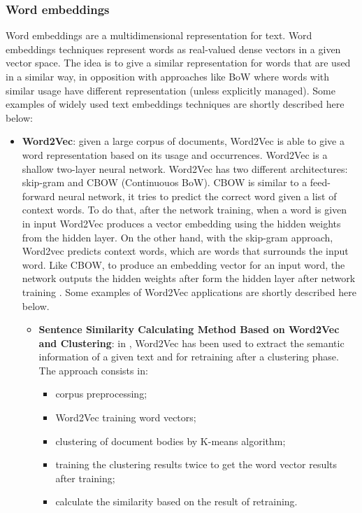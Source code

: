 \documentclass[\main/main.tex]{subfiles}
\begin{document}
\subsubsection{Word embeddings}
Word embeddings are a multidimensional representation for text. Word embeddings techniques represent words as real-valued dense vectors in a given vector space. The idea is to give a similar representation for words that are used in a similar way, in opposition with approaches like BoW where words with similar usage have different representation (unless explicitly managed). Some examples of widely used text embeddings techniques are shortly described here below:
\begin{itemize}
    \item \textbf{Word2Vec}: given a large corpus of documents, Word2Vec is able to give a word representation based on its usage and occurrences. Word2Vec is a shallow two-layer neural network. Word2Vec has two different architectures: skip-gram and CBOW (Continuouos BoW). CBOW is similar to a feed-forward neural network, it tries to predict the correct word given a list of context words. To do that, after the network training, when a word is given in input Word2Vec produces a vector embedding using the hidden weights from the hidden layer. On the other hand, with the skip-gram approach, Word2vec predicts context words, which are words that surrounds the input word. Like CBOW, to produce an embedding vector for an input word, the network outputs the hidden weights after form the hidden layer after network training \cite{mikolov2013efficient}. Some examples of Word2Vec applications are shortly described here below.
    \begin{itemize}
        \item \textbf{Sentence Similarity Calculating Method Based on Word2Vec and Clustering}: in \cite{Song2020SentenceSC}, Word2Vec has been used to extract the semantic information of a given text and for retraining after a clustering phase. The approach consists in: 
        \begin{itemize}
            \item corpus preprocessing;
            \item Word2Vec training word vectors;
            \item clustering of document bodies by K-means algorithm;
            \item training the clustering results twice to get the word vector results after training;
            \item calculate the similarity based on the result of retraining.

\end{itemize}
\end{itemize}
\end{itemize}
\end{document}
